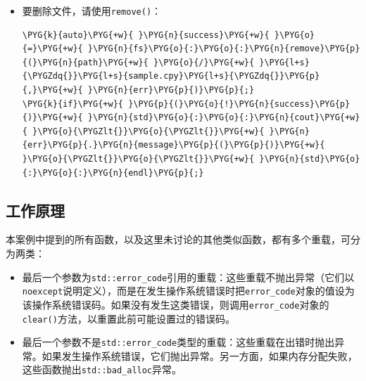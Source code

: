 \begin{itemize}

\item 要删除文件，请使用\texttt{remove()}：



\begin{codeblockbg}
\begin{Verbatim}[commandchars=\\\{\},breaklines=true,breakanywhere=true,fontsize=\codefont,xleftmargin=17bp]
\PYG{k}{auto}\PYG{+w}{ }\PYG{n}{success}\PYG{+w}{ }\PYG{o}{=}\PYG{+w}{ }\PYG{n}{fs}\PYG{o}{:}\PYG{o}{:}\PYG{n}{remove}\PYG{p}{(}\PYG{n}{path}\PYG{+w}{ }\PYG{o}{/}\PYG{+w}{ }\PYG{l+s}{\PYGZdq{}}\PYG{l+s}{sample.cpy}\PYG{l+s}{\PYGZdq{}}\PYG{p}{,}\PYG{+w}{ }\PYG{n}{err}\PYG{p}{)}\PYG{p}{;}
\PYG{k}{if}\PYG{+w}{ }\PYG{p}{(}\PYG{o}{!}\PYG{n}{success}\PYG{p}{)}\PYG{+w}{ }\PYG{n}{std}\PYG{o}{:}\PYG{o}{:}\PYG{n}{cout}\PYG{+w}{ }\PYG{o}{\PYGZlt{}}\PYG{o}{\PYGZlt{}}\PYG{+w}{ }\PYG{n}{err}\PYG{p}{.}\PYG{n}{message}\PYG{p}{(}\PYG{p}{)}\PYG{+w}{ }\PYG{o}{\PYGZlt{}}\PYG{o}{\PYGZlt{}}\PYG{+w}{ }\PYG{n}{std}\PYG{o}{:}\PYG{o}{:}\PYG{n}{endl}\PYG{p}{;}
\end{Verbatim}
\end{codeblockbg}

\end{itemize}



\subsection{工作原理}



本案例中提到的所有函数，以及这里未讨论的其他类似函数，都有多个重载，可分为两类：



\begin{itemize}
\item 最后一个参数为\texttt{std::\allowbreak{}error\_\allowbreak{}code}引用的重载：这些重载不抛出异常（它们以\texttt{noexcept}说明定义），而是在发生操作系统错误时把\texttt{error\_\allowbreak{}code}对象的值设为该操作系统错误码。如果没有发生这类错误，则调用\texttt{error\_\allowbreak{}code}对象的\texttt{clear()}方法，以重置此前可能设置过的错误码。



\item 最后一个参数不是\texttt{std::\allowbreak{}error\_\allowbreak{}code}类型的重载：这些重载在出错时抛出异常。如果发生操作系统错误，它们抛出异常。另一方面，如果内存分配失败，这些函数抛出\texttt{std::\allowbreak{}bad\_\allowbreak{}alloc}异常。

\end{itemize}


